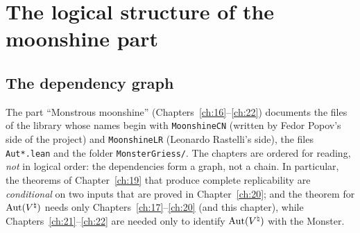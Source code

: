 \section{The logical structure of the moonshine part}\label{ch16:sec:roadmap}

\subsection{The dependency graph}

The part ``Monstrous moonshine'' (Chapters~\ref{ch:16}--\ref{ch:22}) documents the files of the library whose names
begin with \texttt{MoonshineCN} (written by Fedor Popov's side of the project) and \texttt{MoonshineLR} (Leonardo
Rastelli's side), the files \texttt{Aut*.lean} and the folder \texttt{MonsterGriess/}.  The chapters are ordered for
reading, \emph{not} in logical order: the dependencies form a graph, not a chain.  In particular, the theorems of
Chapter~\ref{ch:19} that produce complete replicability are \emph{conditional} on two inputs that are proved in
Chapter~\ref{ch:20}; and the theorem for $\operatorname{Aut}({V^{\natural}})$ needs only Chapters~\ref{ch:17}--\ref{ch:20} (and this chapter),
while Chapters~\ref{ch:21}--\ref{ch:22} are needed only to identify $\operatorname{Aut}({V^{\natural}})$ with the Monster.

